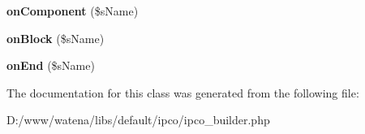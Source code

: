 \begin{DoxyCompactItemize}
\item 
\hypertarget{class_i_p_c_o___builder_a97ce1edee4876fc2ba8457c2e06b8b63}{{\bfseries on\-Component} (\$s\-Name)}\label{class_i_p_c_o___builder_a97ce1edee4876fc2ba8457c2e06b8b63}

\item 
\hypertarget{class_i_p_c_o___builder_a96745a1cfb959004088992f591fda465}{{\bfseries on\-Block} (\$s\-Name)}\label{class_i_p_c_o___builder_a96745a1cfb959004088992f591fda465}

\item 
\hypertarget{class_i_p_c_o___builder_a465645cb52ecb404c6220e356a4e8efd}{{\bfseries on\-End} (\$s\-Name)}\label{class_i_p_c_o___builder_a465645cb52ecb404c6220e356a4e8efd}

\end{DoxyCompactItemize}


The documentation for this class was generated from the following file\-:\begin{DoxyCompactItemize}
\item 
D\-:/www/watena/libs/default/ipco/ipco\-\_\-builder.\-php\end{DoxyCompactItemize}

